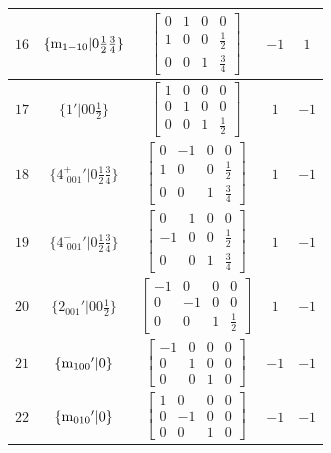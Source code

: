 \documentclass[fleqn,8pt]{jsarticle}
\begin{document}
\begin{longtable}{ccccc}
$ 16 $ & $ \{{\rm m}_{1-10}|0 \frac{1}{2} \frac{3}{4}\} $ & $ \begin{bmatrix} 0 & 1 & 0 & 0 \\ 1 & 0 & 0 & \frac{1}{2} \\ 0 & 0 & 1 & \frac{3}{4} \end{bmatrix} $ & $ -1 $ & $ 1 $ \\ \hline
$ 17 $ & $ \{1{}'|0 0 \frac{1}{2}\} $ & $ \begin{bmatrix} 1 & 0 & 0 & 0 \\ 0 & 1 & 0 & 0 \\ 0 & 0 & 1 & \frac{1}{2} \end{bmatrix} $ & $ 1 $ & $ -1 $ \\ \hline
$ 18 $ & $ \{4^{+}_{\,\,001}{}'|0 \frac{1}{2} \frac{3}{4}\} $ & $ \begin{bmatrix} 0 & -1 & 0 & 0 \\ 1 & 0 & 0 & \frac{1}{2} \\ 0 & 0 & 1 & \frac{3}{4} \end{bmatrix} $ & $ 1 $ & $ -1 $ \\ \hline
$ 19 $ & $ \{4^{-}_{\,\,001}{}'|0 \frac{1}{2} \frac{3}{4}\} $ & $ \begin{bmatrix} 0 & 1 & 0 & 0 \\ -1 & 0 & 0 & \frac{1}{2} \\ 0 & 0 & 1 & \frac{3}{4} \end{bmatrix} $ & $ 1 $ & $ -1 $ \\ \hline
$ 20 $ & $ \{2{}_{001}{}'|0 0 \frac{1}{2}\} $ & $ \begin{bmatrix} -1 & 0 & 0 & 0 \\ 0 & -1 & 0 & 0 \\ 0 & 0 & 1 & \frac{1}{2} \end{bmatrix} $ & $ 1 $ & $ -1 $ \\ \hline
$ 21 $ & $ \{{\rm m}_{100}{}'|0\} $ & $ \begin{bmatrix} -1 & 0 & 0 & 0 \\ 0 & 1 & 0 & 0 \\ 0 & 0 & 1 & 0 \end{bmatrix} $ & $ -1 $ & $ -1 $ \\ \hline
$ 22 $ & $ \{{\rm m}_{010}{}'|0\} $ & $ \begin{bmatrix} 1 & 0 & 0 & 0 \\ 0 & -1 & 0 & 0 \\ 0 & 0 & 1 & 0 \end{bmatrix} $ & $ -1 $ & $ -1 $ \\ \hline

\end{longtable}
\end{document}
